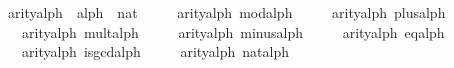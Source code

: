 \begin{isabellebody}
\ arity{}alph\ {}{}\ {}alph\ {}\ nat{}\ \isanewline
\ \ \ \ {}arity{}alph\ mod{}alph\ {}\ {}{}\isanewline
\ \ {}\ {}arity{}alph\ plus{}alph\ {}\ {}{}\isanewline
\ \ {}\ {}arity{}alph\ mult{}alph\ {}\ {}{}\isanewline
\ \ {}\ {}arity{}alph\ minus{}alph\ {}\ {}{}\isanewline
\ \ {}\ {}arity{}alph\ eq{}alph\ {}\ {}{}\isanewline
\ \ {}\ {}arity{}alph\ is{}gcd{}alph\ {}\ {}{}\isanewline
\ \ {}\ {}arity{}alph\ {}nat{}alph\ {}{}\ {}\ {}{}\isanewline
\isanewline
\ \ \isamarkupfalse%

\end{isabellebody}
